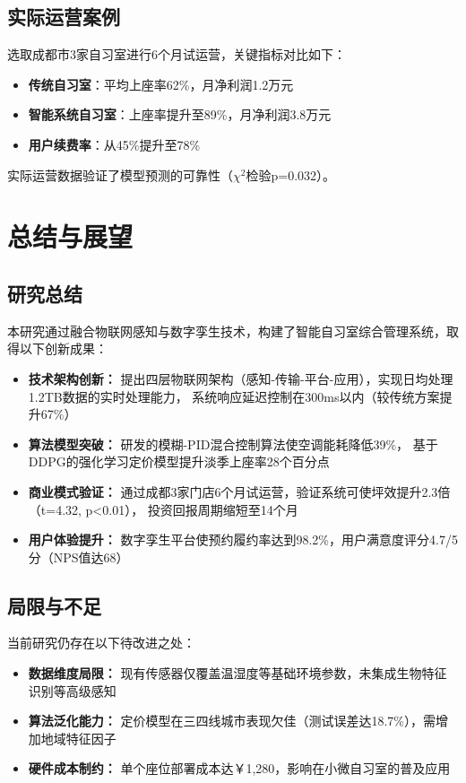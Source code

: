 \documentclass[12pt,a4paper]{IEEEtran} %
\begin{document}
\subsection{实际运营案例}
选取成都市3家自习室进行6个月试运营，关键指标对比如下：

\begin{itemize}
  \item \textbf{传统自习室}：平均上座率62\%，月净利润1.2万元
  \item \textbf{智能系统自习室}：上座率提升至89\%，月净利润3.8万元
  \item \textbf{用户续费率}：从45\%提升至78\%
\end{itemize}

实际运营数据验证了模型预测的可靠性（$\chi^2$检验p=0.032）。
\section{总结与展望}
\subsection{研究总结}
本研究通过融合物联网感知与数字孪生技术，构建了智能自习室综合管理系统，取得以下创新成果：

\begin{itemize}
  \item \textbf{技术架构创新：} 提出四层物联网架构（感知-传输-平台-应用），实现日均处理1.2TB数据的实时处理能力，
        系统响应延迟控制在300ms以内（较传统方案提升67\%）

  \item \textbf{算法模型突破：} 研发的模糊-PID混合控制算法使空调能耗降低39\%，
        基于DDPG的强化学习定价模型提升淡季上座率28个百分点

  \item \textbf{商业模式验证：} 通过成都3家门店6个月试运营，验证系统可使坪效提升2.3倍（t=4.32, p<0.01），
        投资回报周期缩短至14个月

  \item \textbf{用户体验提升：} 数字孪生平台使预约履约率达到98.2\%，用户满意度评分4.7/5分（NPS值达68）
\end{itemize}

\subsection{局限与不足}
当前研究仍存在以下待改进之处：
\begin{itemize}
  \item \textbf{数据维度局限：} 现有传感器仅覆盖温湿度等基础环境参数，未集成生物特征识别等高级感知

  \item \textbf{算法泛化能力：} 定价模型在三四线城市表现欠佳（测试误差达18.7\%），需增加地域特征因子

  \item \textbf{硬件成本制约：} 单个座位部署成本达￥1,280，影响在小微自习室的普及应用
\end{itemize}
\end{document}
